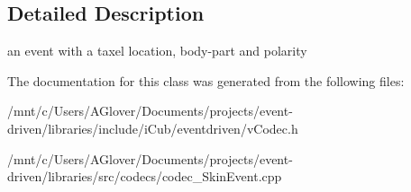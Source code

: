 \subsection{Detailed Description}
an event with a taxel location, body-\/part and polarity 

The documentation for this class was generated from the following files\+:\begin{DoxyCompactItemize}
\item 
/mnt/c/\+Users/\+A\+Glover/\+Documents/projects/event-\/driven/libraries/include/i\+Cub/eventdriven/v\+Codec.\+h\item 
/mnt/c/\+Users/\+A\+Glover/\+Documents/projects/event-\/driven/libraries/src/codecs/codec\+\_\+\+Skin\+Event.\+cpp\end{DoxyCompactItemize}
